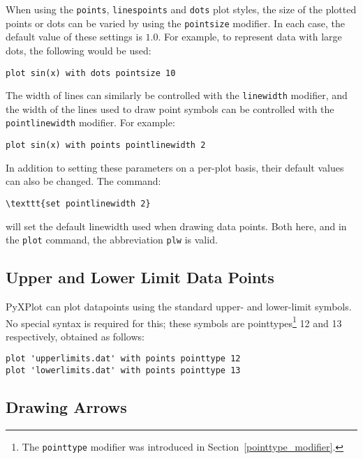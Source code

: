 When using the \texttt{points}, \texttt{linespoints} and \texttt{dots} plot
styles, the size of the plotted points or dots can be varied by using the
\texttt{pointsize} modifier. In each case, the default value of these settings
is $1.0$. For example, to represent data with large dots, the following would
be used:

\begin{verbatim}
plot sin(x) with dots pointsize 10
\end{verbatim}

\noindent The width of lines can similarly be controlled with the
\texttt{linewidth}
modifier, and the width of the lines used to draw point symbols can be
controlled with the \texttt{pointlinewidth} modifier. For example:

\begin{verbatim}
plot sin(x) with points pointlinewidth 2
\end{verbatim}

\noindent
In addition to setting these parameters on a per-plot basis, their default values can also be changed. The command:

\begin{verbatim}
\texttt{set pointlinewidth 2}
\end{verbatim}

\noindent will set the default linewidth used when drawing data points. Both
here, and in the {\tt plot} command, the abbreviation \texttt{plw} is valid. 

\subsection{Upper and Lower Limit Data Points}

PyXPlot can plot datapoints using the standard upper- and lower-limit
symbols. No special
syntax is required for this; these symbols are pointtypes\footnote{The
\texttt{pointtype} modifier was introduced in
Section~\ref{pointtype_modifier}.} 12 and 13 respectively, obtained as follows:

\begin{verbatim}
plot 'upperlimits.dat' with points pointtype 12
plot 'lowerlimits.dat' with points pointtype 13
\end{verbatim}

\subsection{Drawing Arrows}
\label{arrows_plot_style} 

